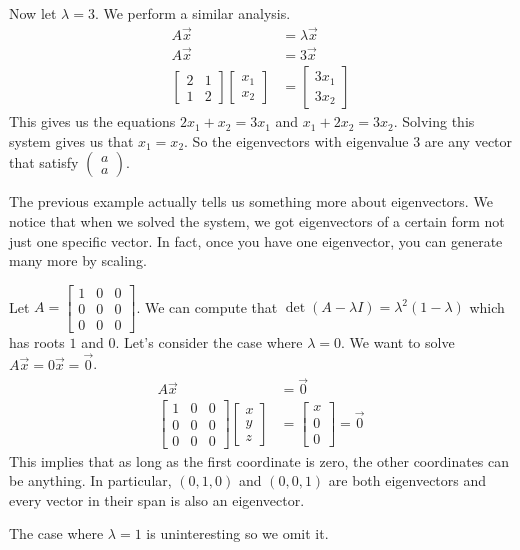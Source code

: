 \begin{example}
    Now let $\lambda=3$. We perform a similar analysis.
    \begin{align*}
        A\vec{x}&=\lambda\vec{x}\\
        A\vec{x}&=3\vec{x}\\
        \begin{bmatrix}
            2 & 1\\
            1 & 2
        \end{bmatrix}\begin{bmatrix}
            x_1 \\ x_2
        \end{bmatrix}&=\begin{bmatrix}
            3x_1 \\ 3x_2
        \end{bmatrix}
    \end{align*}
    This gives us the equations $2x_1+x_2=3x_1$ and $x_1+2x_2=3x_2$. Solving this system gives us that $x_1=x_2$. So the eigenvectors with eigenvalue $3$ are any vector that satisfy $\begin{pmatrix}
        a \\ a
    \end{pmatrix}$.
\end{example}
The previous example actually tells us something more about eigenvectors. We notice that when we solved the system, we got eigenvectors of a certain form not just one specific vector. In fact, once you have one eigenvector, you can generate many more by scaling.
\begin{example}
    Let $A=\begin{bmatrix}
        1 & 0 & 0\\
        0 & 0 & 0\\
       0 & 0 & 0
    \end{bmatrix}$. We can compute that $\det(A-\lambda I)=\lambda^2(1-\lambda)$ which has roots $1$ and $0$. Let's consider the case where $\lambda =0$. We want to solve $A\vec{x}=0\vec{x}=\vec{0}$.
    \begin{align*}
        A\vec{x}&=\vec{0}\\
        \begin{bmatrix}
        1 & 0 & 0\\
        0 & 0 & 0\\
       0 & 0 & 0
    \end{bmatrix}\begin{bmatrix}
        x \\ y \\ z
    \end{bmatrix}&=\begin{bmatrix}
        x \\ 0 \\ 0
    \end{bmatrix}=\vec{0}
    \end{align*}
    This implies that as long as the first coordinate is zero, the other coordinates can be anything. In particular, $(0,1,0)$ and $(0,0,1)$ are both eigenvectors and every vector in their span is also an eigenvector.

    The case where $\lambda=1$ is uninteresting so we omit it.
\end{example}

